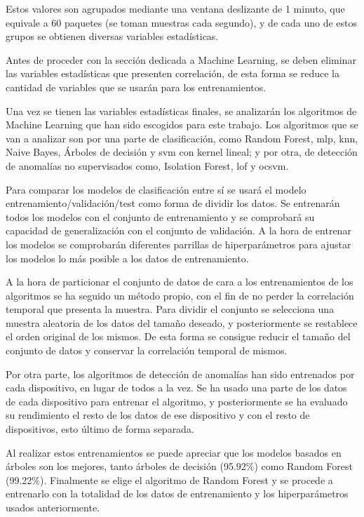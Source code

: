 Estos valores son agrupados mediante una ventana deslizante de 1 minuto, que equivale a 60 paquetes (se toman muestras cada segundo), y de cada uno de estos grupos se obtienen diversas variables estadísticas.

Antes de proceder con la sección dedicada a Machine Learning, se deben eliminar las variables estadísticas que presenten correlación, de esta forma se reduce la cantidad de variables que se usarán para los entrenamientos.

Una vez se tienen las variables estadísticas finales, se analizarán los algoritmos de Machine Learning que han sido escogidos para este trabajo. Los algoritmos que se van a analizar son por una parte de clasificación, como Random Forest, \acrfull{mlp}, \acrfull{knn}, Naive Bayes, Árboles de decisión y \acrfull{svm} con kernel lineal; y por otra, de detección de anomalías no supervisados como, Isolation Forest, \acrfull{lof} y \acrfull{ocsvm}.

Para comparar los modelos de clasificación entre sí se usará el modelo entrenamiento/validación/test como forma de dividir los datos. Se entrenarán todos los modelos con el conjunto de entrenamiento y se comprobará su capacidad de generalización con el conjunto de validación. A la hora de entrenar los modelos se comprobarán diferentes parrillas de hiperparámetros para ajustar los modelos lo más posible a los datos de entrenamiento.

A la hora de particionar el conjunto de datos de cara a los entrenamientos de los algoritmos se ha seguido un método propio, con el fin de no perder la correlación temporal que presenta la muestra. Para dividir el conjunto se selecciona una muestra aleatoria de los datos del tamaño deseado, y posteriormente se restablece el orden original de los mismos. De esta forma se consigue reducir el tamaño del conjunto de datos y conservar la correlación temporal de mismos.

Por otra parte, los algoritmos de detección de anomalías han sido entrenados por cada dispositivo, en lugar de todos a la vez. Se ha usado una parte de los datos de cada dispositivo para entrenar el algoritmo, y posteriormente se ha evaluado su rendimiento el resto de los datos de ese dispositivo y con el resto de dispositivos, esto último de forma separada.

Al realizar estos entrenamientos se puede apreciar que los modelos basados en árboles son los mejores, tanto árboles de decisión (95.92\%) como Random Forest (99.22\%). Finalmente se elige el algoritmo de Random Forest y se procede a entrenarlo con la totalidad de los datos de entrenamiento y los hiperparámetros usados anteriormente. 

